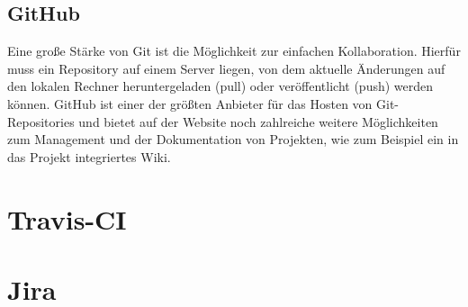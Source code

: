 \subsection{GitHub}
Eine große Stärke von Git ist die Möglichkeit zur einfachen Kollaboration. Hierfür muss ein Repository auf einem Server liegen, von dem aktuelle Änderungen auf den lokalen Rechner heruntergeladen (pull) oder veröffentlicht (push) werden können. GitHub ist einer der größten Anbieter für das Hosten von Git-Repositories und bietet auf der Website noch zahlreiche weitere Möglichkeiten zum Management und der Dokumentation von Projekten, wie zum Beispiel ein in das Projekt integriertes Wiki.

\section{Travis-CI}

\section{Jira}